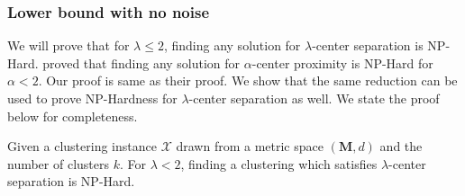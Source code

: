 \documentclass[anon,12pt]{colt2016} %
\newcommand{\mc}{\mathcal}
\newcommand{\mb}{\mathbf}
\begin{document}

\subsubsection{Lower bound with no noise}
We will prove that for $\lambda \le 2$, finding any solution for $\lambda$-center separation is NP-Hard. \cite{reyzin2012data} proved that finding any solution for $\alpha$-center proximity is NP-Hard for $\alpha < 2$. Our proof is same as their proof. We show that the same reduction can be used to prove NP-Hardness for $\lambda$-center separation as well. We state the proof below for completeness.

\begin{theorem}
Given a clustering instance $\mc X$ drawn from a metric space $(\mb M, d)$ and the number of clusters $k$. For $\lambda < 2$, finding a clustering which satisfies $\lambda$-center separation is NP-Hard.
\end{theorem}
\end{document}
